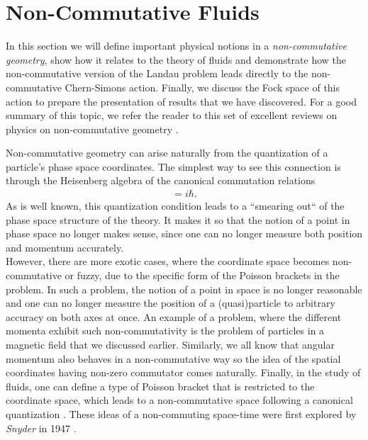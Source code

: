         \section{Non-Commutative Fluids}
    In this section we will define important physical notions in a \textit{non-commutative geometry}, show how it relates to the theory of fluids and demonstrate how the non-commutative version of the Landau problem leads directly to the non-commutative Chern-Simons action. Finally, we discuss the Fock space of this action to prepare the presentation of results that we have discovered. For a good summary of this topic, we refer the reader to this set of excellent reviews on physics on non-commutative geometry \cite{Polychronakos:2007df, Szabo:2001kg, Douglas:2001ba}.

    Non-commutative geometry can arise naturally from the quantization of a particle's phase space coordinates. The simplest way to see this connection is through the Heisenberg algebra of the canonical commutation relations
    \begin{align}
        [\hat{x}, \hat{p}] = i \hbar.
    \end{align}
    As is well known, this quantization condition leads to a ``smearing out`` of the phase space structure of the theory. It makes it so that the notion of a point in phase space no longer makes sense, since one can no longer measure both position and momentum accurately. \\
    \indent However, there are more exotic cases, where the coordinate space becomes non-commutative or fuzzy, due to the specific form of the Poisson brackets in the problem. In such a problem, the notion of a point in space is no longer reasonable and one can no longer measure the position of a (quasi)particle to arbitrary accuracy on both axes at once. An example of a problem, where the different momenta exhibit such non-commutativity is the problem of particles in a magnetic field that we discussed earlier. Similarly, we all know that angular momentum also behaves in a non-commutative way so the idea of the spatial coordinates having non-zero commutator comes naturally. Finally, in the study of fluids, one can define a type of Poisson bracket that is restricted to the coordinate space, which leads to a non-commutative space following a canonical quantization \cite{Jackiw:2002pn}. These ideas of a non-commuting space-time were first explored by \textit{Snyder} in 1947 \cite{Snyder:1946qz, Snyder:1947nq}.
